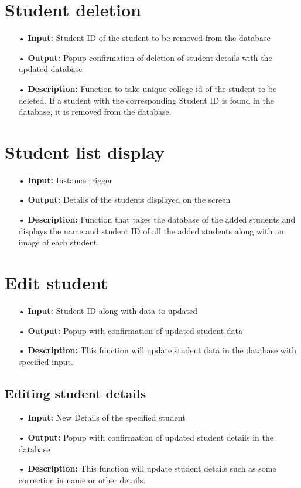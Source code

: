 \documentclass{scrreprt}
\begin{document}
\section{Student deletion}
\begin{enumerate}
\item[•]  \textbf{Input:}
Student ID of the student to be removed from the database
\item[•]  \textbf{Output:}
Popup confirmation of deletion of student details with the updated database
\item[•]  \textbf{Description:}
Function to take unique college id of the student to be deleted. If a
student with the corresponding Student ID is found in the database, 
it is removed from the database.
\end{enumerate}

\section{Student list display}
\begin{enumerate}
\item[•]  \textbf{Input:}
Instance trigger
\item[•]  \textbf{Output:}
Details of the students displayed on the screen
\item[•]  \textbf{Description:}
Function that takes the database of the added students and displays the name
and student ID of all the added students along with an image of each
student.
\end{enumerate}


\section{Edit student}
\begin{enumerate}
\item[•]  \textbf{Input:}
Student ID along with data to updated
\item[•]  \textbf{Output:}
Popup with confirmation of updated student data
\item[•]  \textbf{Description:} This function will update student data in the database with specified input.
\end{enumerate}

\subsection{Editing student details}
\begin{enumerate}
\item[•]  \textbf{Input:}
New Details of the specified student
\item[•]  \textbf{Output:}
Popup with confirmation of updated student details in the database
\item[•]  \textbf{Description:} This function will update student details such as some correction in name or other details.
\end{enumerate}
\end{document}
